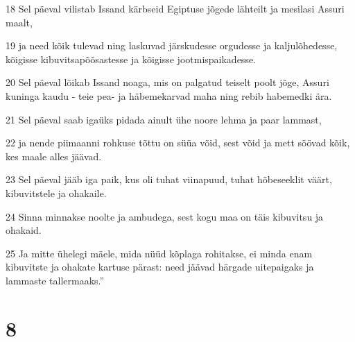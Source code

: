 \par 18 Sel päeval vilistab Issand kärbseid Egiptuse jõgede lähteilt ja mesilasi Assuri maalt,
\par 19 ja need kõik tulevad ning laskuvad järskudesse orgudesse ja kaljulõhedesse, kõigisse kibuvitsapõõsastesse ja kõigisse jootmispaikadesse.
\par 20 Sel päeval lõikab Issand noaga, mis on palgatud teiselt poolt jõge, Assuri kuninga kaudu - teie pea- ja häbemekarvad maha ning rebib habemedki ära.
\par 21 Sel päeval saab igaüks pidada ainult ühe noore lehma ja paar lammast,
\par 22 ja nende piimaanni rohkuse tõttu on süüa võid, sest võid ja mett söövad kõik, kes maale alles jäävad.
\par 23 Sel päeval jääb iga paik, kus oli tuhat viinapuud, tuhat hõbeseeklit väärt, kibuvitstele ja ohakaile.
\par 24 Sinna minnakse noolte ja ambudega, sest kogu maa on täis kibuvitsu ja ohakaid.
\par 25 Ja mitte ühelegi mäele, mida nüüd kõplaga rohitakse, ei minda enam kibuvitste ja ohakate kartuse pärast: need jäävad härgade uitepaigaks ja lammaste tallermaaks.”

\chapter{8}

